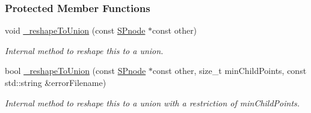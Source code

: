 \subsubsection*{\-Protected \-Member \-Functions}
\begin{DoxyCompactItemize}
\item 
void \hyperlink{classsubpavings_1_1SPSnode_add75213a0cf94b42aa82aca57b02da3e}{\-\_\-reshape\-To\-Union} (const \hyperlink{classsubpavings_1_1SPnode}{\-S\-Pnode} $\ast$const other)
\begin{DoxyCompactList}\small\item\em \-Internal method to reshape this to a union. \end{DoxyCompactList}\item 
bool \hyperlink{classsubpavings_1_1SPSnode_acae5407bbd325c9c4852c5a77304cee9}{\-\_\-reshape\-To\-Union} (const \hyperlink{classsubpavings_1_1SPnode}{\-S\-Pnode} $\ast$const other, size\-\_\-t min\-Child\-Points, const std\-::string \&error\-Filename)
\begin{DoxyCompactList}\small\item\em \-Internal method to reshape this to a union with a restriction of min\-Child\-Points. \end{DoxyCompactList}\end{DoxyCompactItemize}
